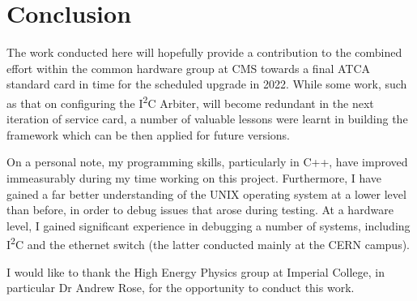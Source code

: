 \documentclass[a4paper,11pt,twocolumn]{article}
\begin{document}
	\section{Conclusion}
	The work conducted here will hopefully provide a contribution to the combined effort within the common hardware group at CMS towards a final ATCA standard card in time for the scheduled upgrade in 2022. While some work, such as that on configuring the I\textsuperscript{2}C Arbiter, will become redundant in the next iteration of service card, a number of valuable lessons were learnt in building the framework which can be then applied for future versions.

	On a personal note, my programming skills, particularly in C++, have improved immeasurably during my time working on this project. Furthermore, I have gained a far better understanding of the UNIX operating system at a lower level than before, in order to debug issues that arose during testing. At a hardware level, I gained significant experience in debugging a number of systems, including I\textsuperscript{2}C and the ethernet switch (the latter conducted mainly at the CERN campus).

	I would like to thank the High Energy Physics group at Imperial College, in particular Dr Andrew Rose, for the opportunity to conduct this work.

	
	
\end{document}
